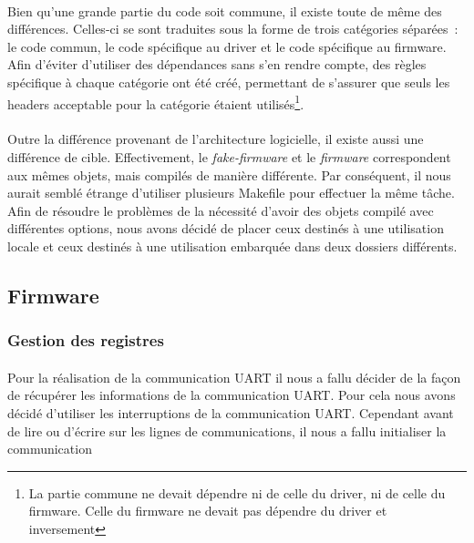 \paragraph{}
Bien qu'une grande partie du code soit commune, il existe toute de même des
différences. Celles-ci se sont traduites sous la forme de trois catégories
séparées~:
le code commun, le code spécifique au driver et le code spécifique au firmware.
Afin d'éviter d'utiliser des dépendances sans s'en rendre compte, des règles
spécifique à chaque catégorie ont été créé, permettant de s'assurer que seuls
les headers acceptable pour la catégorie étaient utilisés\footnote{La partie
commune ne devait dépendre ni de celle du driver, ni de celle du firmware. Celle
du firmware ne devait pas dépendre du driver et inversement}.

\paragraph{}
Outre la différence provenant de l'architecture logicielle, il existe aussi une
différence de cible. Effectivement, le {\em fake-firmware} et le {\em firmware}
correspondent aux mêmes objets, mais compilés de manière différente. Par
conséquent, il nous aurait semblé étrange d'utiliser plusieurs Makefile pour
effectuer la même tâche. Afin de résoudre le problèmes de la nécessité d'avoir
des objets compilé avec différentes options, nous avons décidé de placer ceux
destinés à une utilisation locale et ceux destinés à une utilisation embarquée
dans deux dossiers différents.

\subsection{Firmware}

\subsubsection{Gestion des registres}

\paragraph{}
Pour la réalisation de la communication UART il nous a fallu décider de la façon
de récupérer les informations de la communication UART. Pour cela nous avons
décidé d'utiliser les interruptions de la communication UART. Cependant avant de
lire ou d'écrire sur les lignes de communications, il nous a fallu initialiser
la communication

